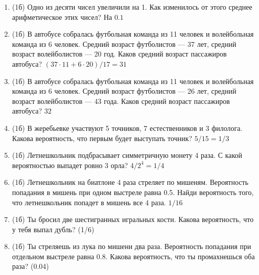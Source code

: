 \documentclass[a4paper, 12pt]{article}
\begin{document}
\begin{enumerate}
\item (1б) Одно из десяти чисел увеличили на 1. Как изменилось от этого среднее арифметическое этих чисел? На $0.1$
\item (1б) В автобусе собралась футбольная команда из 11 человек и волейбольная команда из 6 человек. Средний возраст футболистов — 37 лет, средний возраст волейболистов — 20 год. Каков средний возраст пассажиров автобуса? $(37 \cdot 11 + 6 \cdot 20)/17=31$
\item (1б) В автобусе собралась футбольная команда из 11 человек и волейбольная команда из 6 человек. Средний возраст футболистов — 26 лет, средний возраст волейболистов — 43 года. Каков средний возраст пассажиров автобуса? $32$
\item (1б) В жеребьевке участвуют 5 точников, 7 естественников и 3 филолога.
Какова вероятность, что первым будет выступать точник? $5/15=1/3$
\item (1б) Летнешкольник подбрасывает симметричную монету 4 раза.
С какой вероятностью выпадет ровно 3 орла? $4/2^4=1/4$
\item (1б) Летнешкольник на биатлоне 4 раза стреляет по мишеням.
Вероятность попадания в мишень при одном выстреле равна 0.5.
Найди вероятность того, что летнешкольник попадет в мишень все 4 раза. $1/16$
\item (1б) Ты бросил две шестигранных игральных кости. Какова вероятность, что у тебя выпал дубль?
(1/6)
\item (1б) Ты стреляешь из лука по мишени два раза. Вероятность попадания при отдельном выстреле равна 0.8.
Какова вероятность, что ты промахнешься оба раза? (0.04)

\end{enumerate}
\end{document}
